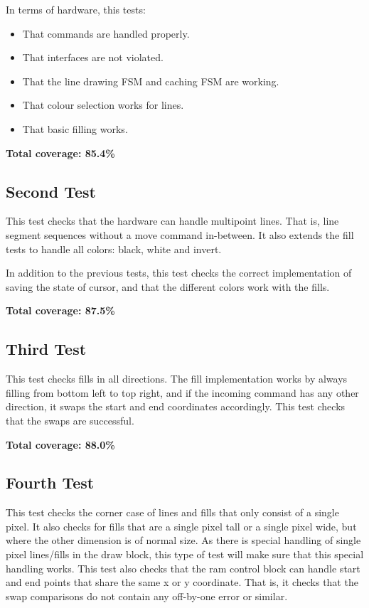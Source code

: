 \documentclass[]{article}
\begin{document}
In terms of hardware, this tests:
\begin{itemize}
	\item That commands are handled properly.
	\item That interfaces are not violated.
	\item That the line drawing FSM and caching FSM are working.
	\item That colour selection works for lines.
	\item That basic filling works.
\end{itemize}

\textbf{Total coverage: 85.4\%}


\subsection{Second Test} %
\label{sub:second_test}
This test checks that the hardware can handle multipoint lines. That is, line segment sequences without a move command in-between. It also extends the fill tests to handle all colors: black, white and invert.

In addition to the previous tests, this test checks the correct implementation of saving the state of cursor, and that the different colors work with the fills.

\textbf{Total coverage: 87.5\%}


\subsection{Third Test} %
\label{sub:third_test}

This test checks fills in all directions. The fill implementation works by always filling from bottom left to top right, and if the incoming command has any other direction, it swaps the start and end coordinates accordingly. This test checks that the swaps are successful.

\textbf{Total coverage: 88.0\%}


\subsection{Fourth Test} %
\label{sub:fourth_test}

This test checks the corner case of lines and fills that only consist of a single pixel. It also checks for fills that are a single pixel tall or a single pixel wide, but where the other dimension is of normal size.
As there is special handling of single pixel lines/fills in the draw block, this type of test will make sure that this special handling works.
This test also checks that the ram control block can handle start and end points that share the same x or y coordinate. That is, it checks that the swap comparisons do not contain any off-by-one error or similar.
\end{document}
